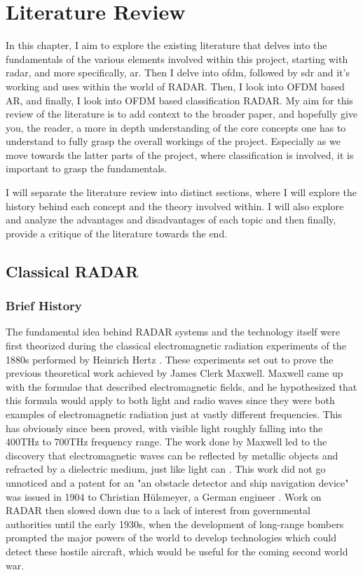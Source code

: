\documentclass[class=report,11pt,crop=false]{standalone}
\begin{document}
\chapter{Literature Review}\label{ch:Literature}
In this chapter, I aim to explore the existing literature that delves into the fundamentals of the various elements involved within this project, starting with \gls{radar}, and more specifically, \gls{ar}. Then I delve into \gls{ofdm}, followed by \gls{sdr} and it's working and uses within the world of RADAR. Then, I look into OFDM based AR, and finally, I look into OFDM based classification RADAR. My aim for this review of the literature is to add context to the broader paper, and hopefully give you, the reader, a more in depth understanding of the core concepts one has to understand to fully grasp the overall workings of the project. Especially as we move towards the latter parts of the project, where classification is involved, it is important to grasp the fundamentals.

I will separate the literature review into distinct sections, where I will explore the history behind each concept and the theory involved within. I will also explore and analyze the advantages and disadvantages of each topic and then finally, provide a critique of the literature towards the end.



\section{Classical RADAR}
\subsection{Brief History}
The fundamental idea behind RADAR systems and the technology itself were first theorized during the classical electromagnetic radiation experiments of the 1880s performed by Heinrich Hertz \cite{skolnik_radar_2024}. These experiments set out to prove the previous theoretical work achieved by James Clerk Maxwell. Maxwell came up with the formulae that described electromagnetic fields, and he hypothesized that this formula would apply to both light and radio waves since they were both examples of electromagnetic radiation just at vastly different frequencies. This has obviously since been proved, with visible light roughly falling into the 400THz to 700THz frequency range. The work done by Maxwell led to the discovery that electromagnetic waves can be reflected by metallic objects and refracted by a dielectric medium, just like light can \cite{skolnik_radar_2024}. This work did not go unnoticed and a patent for an "an obstacle detector and ship navigation device" was issued in 1904 to Christian Hülsmeyer, a German engineer \cite{skolnik_radar_2024}. Work on RADAR then slowed down due to a lack of interest from governmental authorities until the early 1930s, when the development of long-range bombers prompted the major powers of the world to develop technologies which could detect these hostile aircraft, which would be useful for the coming second world war.
\end{document}
